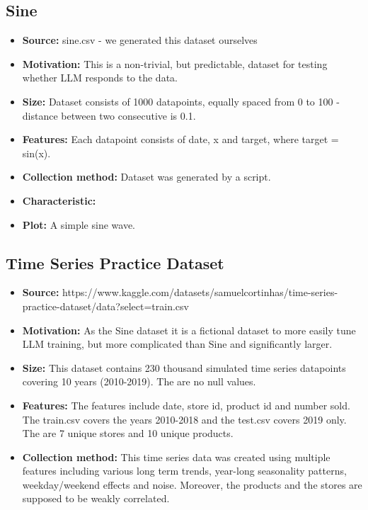 \subsection{Sine}
\begin{itemize}
	\item \textbf{Source:} sine.csv - we generated this dataset ourselves
	\item \textbf{Motivation:} This is a non-trivial, but predictable, dataset for testing whether LLM responds to the data.
	\item \textbf{Size:} Dataset consists of 1000 datapoints, equally spaced from 0 to 100 - distance between two consecutive is 0.1.
	\item \textbf{Features:} Each datapoint consists of date, x and target, where target = sin(x).
	\item \textbf{Collection method:} Dataset was generated by a script.
	\item \textbf{Characteristic:}
	\item \textbf{Plot:} A simple sine wave.
\end{itemize}

\subsection{Time Series Practice Dataset}
\begin{itemize}


	\item \textbf{Source:} https://www.kaggle.com/datasets/samuelcortinhas/time-series-practice-dataset/data?select=train.csv
	\item \textbf{Motivation:} As the Sine dataset it is a fictional dataset to more easily tune LLM training, but more complicated than Sine and significantly larger.
	\item \textbf{Size:} This dataset contains 230 thousand simulated time series datapoints covering 10 years (2010-2019).  The are no null values.
	\item \textbf{Features:} The features include date, store id, product id and number sold. The train.csv covers the years 2010-2018 and the test.csv covers 2019 only. The are 7 unique stores and 10 unique products.
	\item \textbf{Collection method:} This time series data was created using multiple features including various long term trends, year-long seasonality patterns, weekday/weekend effects and noise. Moreover, the products and the stores are supposed to be weakly correlated.

\end{itemize}

